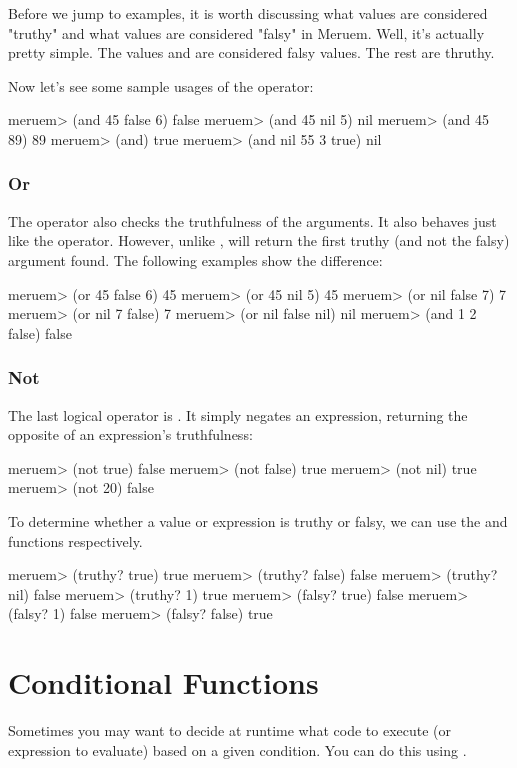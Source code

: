 Before we jump to examples, it is worth discussing what values are considered "truthy" and what values are considered "falsy" in Meruem. Well, it's actually pretty simple. The values  and  are considered falsy values. The rest are thruthy.

Now let's see some sample usages of the  operator:

\begin{REPL}
meruem> (and 45 false 6)
false
meruem> (and 45 nil 5)
nil
meruem> (and 45 89)
89
meruem> (and)
true
meruem> (and nil 55 3 true)
nil
\end{REPL}

\subsubsection{Or}
The  operator also checks the truthfulness of the arguments. It also behaves just like the  operator. However, unlike ,  will return the first truthy (and not the falsy) argument found. The following examples show the difference:

\begin{REPL}
meruem> (or 45 false 6)
45
meruem> (or 45 nil 5)
45
meruem> (or nil false 7)
7
meruem> (or nil 7 false)
7
meruem> (or nil false nil)  
nil
meruem> (and 1 2 false)
false
\end{REPL}

\subsubsection{Not}
The last logical operator is . It simply negates an expression, returning the opposite of an expression's truthfulness:

\begin{REPL}
meruem> (not true)
false
meruem> (not false)
true
meruem> (not nil)
true
meruem> (not 20)
false
\end{REPL}

To determine whether a value or expression is truthy or falsy, we can use the  and  functions respectively.

\begin{REPL}
meruem> (truthy? true)
true
meruem> (truthy? false)
false
meruem> (truthy? nil)
false
meruem> (truthy? 1)
true
meruem> (falsy? true)
false
meruem> (falsy? 1)
false
meruem> (falsy? false)
true
\end{REPL}

\section{Conditional Functions}
Sometimes you may want to decide at runtime what code to execute (or expression to evaluate) based on a given condition. You can do this using . 

